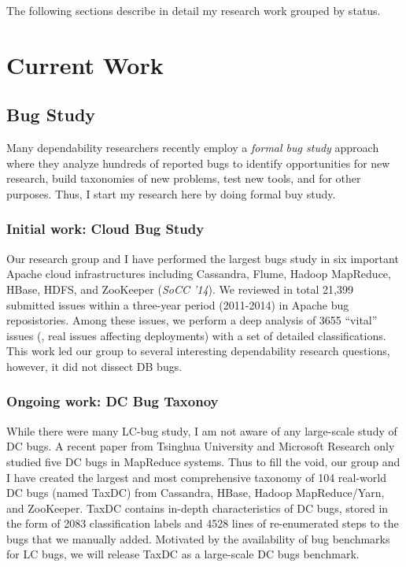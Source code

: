 \documentclass[11pt]{article}
\begin{document}
The following sections describe in detail my research work grouped by status.

\section*{Current Work}

\subsection{Bug Study}

Many dependability researchers recently employ a \textit{formal bug study}
approach where they analyze hundreds of reported bugs to identify opportunities
for new research, build taxonomies of new problems, test new tools, and for
other purposes. Thus, I start my research here by doing formal buy study.

\subsubsection*{Initial work: Cloud Bug Study}

Our research group and I have performed the largest bugs study in six important
Apache cloud infrastructures including Cassandra, Flume, Hadoop MapReduce,
HBase, HDFS, and ZooKeeper (\textit{SoCC '14}). We reviewed in total 21,399
submitted issues within a three-year period (2011-2014) in Apache bug
reposistories. Among these issues, we perform a deep analysis of 3655 ``vital''
issues (\ie, real issues affecting deployments) with a set of detailed
classifications. This work led our group to several interesting dependability
research questions, however, it did not dissect DB bugs. 

\subsubsection*{Ongoing work: DC Bug Taxonoy} 

While there were many LC-bug study, I am not aware of any large-scale study of
DC bugs. A recent paper from Tsinghua University and Microsoft Research only
studied five DC bugs in MapReduce systems. Thus to fill the void, our group and
I have created the largest and most comprehensive taxonomy of 104 real-world DC
bugs (named TaxDC) from Cassandra, HBase, Hadoop MapReduce/Yarn, and ZooKeeper.
TaxDC contains in-depth characteristics of DC bugs, stored in the form of 2083
classification labels and 4528 lines of re-enumerated steps to the bugs that we
manually added. Motivated by the availability of bug benchmarks for LC bugs, we
will release TaxDC as a large-scale DC bugs benchmark.
\end{document}
